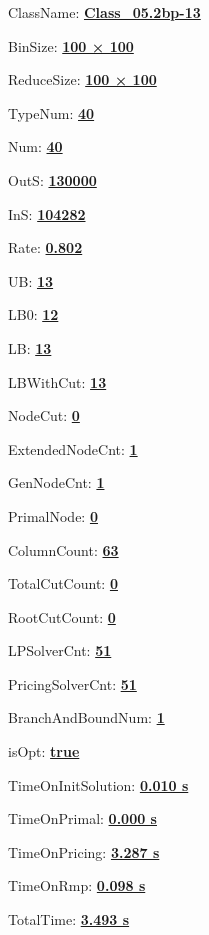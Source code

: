 \documentclass[11pt]{article}
\begin{document}
\pagestyle{empty}


ClassName: \underline{\textbf{Class_05.2bp-13}}
\par
BinSize: \underline{\textbf{100 × 100}}
\par
ReduceSize: \underline{\textbf{100 × 100}}
\par
TypeNum: \underline{\textbf{40}}
\par
Num: \underline{\textbf{40}}
\par
OutS: \underline{\textbf{130000}}
\par
InS: \underline{\textbf{104282}}
\par
Rate: \underline{\textbf{0.802}}
\par
UB: \underline{\textbf{13}}
\par
LB0: \underline{\textbf{12}}
\par
LB: \underline{\textbf{13}}
\par
LBWithCut: \underline{\textbf{13}}
\par
NodeCut: \underline{\textbf{0}}
\par
ExtendedNodeCnt: \underline{\textbf{1}}
\par
GenNodeCnt: \underline{\textbf{1}}
\par
PrimalNode: \underline{\textbf{0}}
\par
ColumnCount: \underline{\textbf{63}}
\par
TotalCutCount: \underline{\textbf{0}}
\par
RootCutCount: \underline{\textbf{0}}
\par
LPSolverCnt: \underline{\textbf{51}}
\par
PricingSolverCnt: \underline{\textbf{51}}
\par
BranchAndBoundNum: \underline{\textbf{1}}
\par
isOpt: \underline{\textbf{true}}
\par
TimeOnInitSolution: \underline{\textbf{0.010 s}}
\par
TimeOnPrimal: \underline{\textbf{0.000 s}}
\par
TimeOnPricing: \underline{\textbf{3.287 s}}
\par
TimeOnRmp: \underline{\textbf{0.098 s}}
\par
TotalTime: \underline{\textbf{3.493 s}}
\par
\newpage


\end{document}
